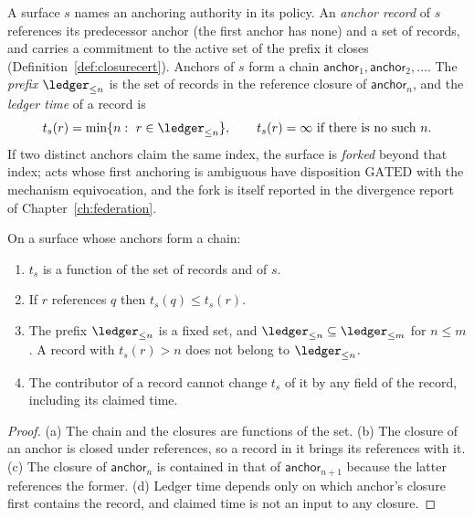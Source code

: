 \begin{definition}\label{def:anchor}
A surface $s$ names an anchoring authority in its policy. An \emph{anchor record} of $s$ references its predecessor anchor (the first anchor has none) and a set of records, and carries a commitment to the active set of the prefix it closes (Definition~\ref{def:closurecert}). Anchors of $s$ form a chain $\mathsf{anchor}_1,\mathsf{anchor}_2,\dots$. The \emph{prefix} $\ledger_{\le n}$ is the set of records in the reference closure of $\mathsf{anchor}_n$, and the \emph{ledger time} of a record is
\[
t_s(r)=\min\{n:\ r\in\ledger_{\le n}\},\qquad t_s(r)=\infty\text{ if there is no such }n.
\]
If two distinct anchors claim the same index, the surface is \emph{forked} beyond that index; acts whose first anchoring is ambiguous have disposition $\mathrm{GATED}$ with the mechanism \textsf{equivocation}, and the fork is itself reported in the divergence report of Chapter~\ref{ch:federation}.
\end{definition}

\begin{proposition}\label{prop:ledgertime}
On a surface whose anchors form a chain:
\begin{enumerate}[label=(\alph*)]
\item $t_s$ is a function of the set of records and of $s$.
\item If $r$ references $q$ then $t_s(q)\le t_s(r)$.
\item The prefix $\ledger_{\le n}$ is a fixed set, and $\ledger_{\le n}\subseteq\ledger_{\le m}$ for $n\le m$. A record with $t_s(r)>n$ does not belong to $\ledger_{\le n}$.
\item The contributor of a record cannot change $t_s$ of it by any field of the record, including its claimed time.
\end{enumerate}
\end{proposition}

\begin{proof}
(a) The chain and the closures are functions of the set. (b) The closure of an anchor is closed under references, so a record in it brings its references with it. (c) The closure of $\mathsf{anchor}_n$ is contained in that of $\mathsf{anchor}_{n+1}$ because the latter references the former. (d) Ledger time depends only on which anchor's closure first contains the record, and claimed time is not an input to any closure.
\end{proof}

